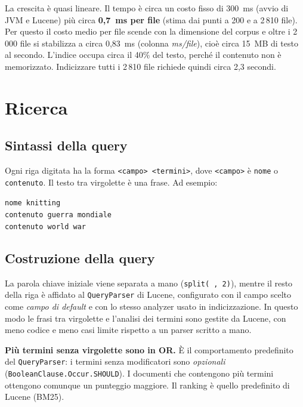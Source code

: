 \documentclass[11pt,a4paper]{article}
\newcommand{\dq}{\textquotedbl}            %
\newcommand{\code}[1]{\texttt{#1}}
\newcommand{\field}[1]{\texttt{#1}}
\begin{document}
\noindent La crescita è quasi lineare. Il tempo è circa un costo fisso di
300~ms (avvio di JVM e Lucene) più circa \textbf{0,7~ms per file} (stima dai punti
a 200 e a 2\,810 file). Per questo il costo medio per file scende con la dimensione
del corpus e oltre i 2\,000 file si stabilizza a circa 0,83~ms (colonna
\emph{ms/file}), cioè circa 15~MB di testo al secondo.
L'indice occupa circa il 40\% del testo, perché il contenuto non è memorizzato.
Indicizzare tutti i 2\,810 file richiede quindi circa 2,3 secondi.

\section{Ricerca}

\subsection{Sintassi della query}

Ogni riga digitata ha la forma \code{<campo> <termini>}, dove \code{<campo>} è
\field{nome} o \field{contenuto}. Il
testo tra virgolette è una frase. Ad esempio:
\begin{center}
\code{nome knitting}\\
\code{contenuto guerra mondiale}\\
\code{contenuto \dq{}world war\dq}
\end{center}

\subsection{Costruzione della query}

La parola chiave iniziale viene separata a mano (\code{split(\dq{} \dq{}, 2)}), mentre il
resto della riga è affidato al \code{QueryParser} di Lucene, configurato con il
campo scelto come \emph{campo di default} e con lo stesso analyzer usato in
indicizzazione. In questo modo le frasi tra virgolette e l'analisi dei termini
sono gestite da Lucene, con meno codice e meno casi limite rispetto a un parser
scritto a mano.

\textbf{Più termini senza virgolette sono in OR.} È il comportamento predefinito
del \code{QueryParser}: i termini senza
modificatori sono \emph{opzionali} (\code{BooleanClause.\allowbreak Occur.\allowbreak SHOULD}). I documenti
che contengono più termini ottengono comunque un punteggio maggiore. Il ranking è
quello predefinito di Lucene (BM25).
\end{document}

